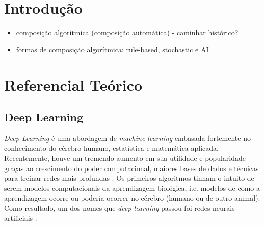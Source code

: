 \documentclass{automatextcc}
\begin{document}
\listoftables




\chapter{Introdução}

\begin{itemize}
    \item composição algorítmica (composição automática) - caminhar histórico?
    \item formas de composição algorítmica: rule-based, stochastic e AI
\end{itemize}





\chapter{Referencial Teórico}


\section{Deep Learning}
\textit{Deep Learning} é uma abordagem de \textit{machine learning} embasada fortemente no conhecimento do cérebro humano, estatística e matemática aplicada. Recentemente, houve um tremendo aumento em sua utilidade e popularidade graças ao crescimento do poder computacional, maiores bases de dados e técnicas para treinar redes mais profundas \citep{mit2016deeplearningbook}. Os primeiros algoritmos tinham o intuito de serem modelos computacionais da aprendizagem biológica, i.e. modelos de como a aprendizagem ocorre ou poderia ocorrer no cérebro (humano ou de outro animal). Como resultado, um dos nomes que \textit{deep learning} passou foi redes neurais artificiais \citep{mit2016deeplearningbook}.
\end{document}
